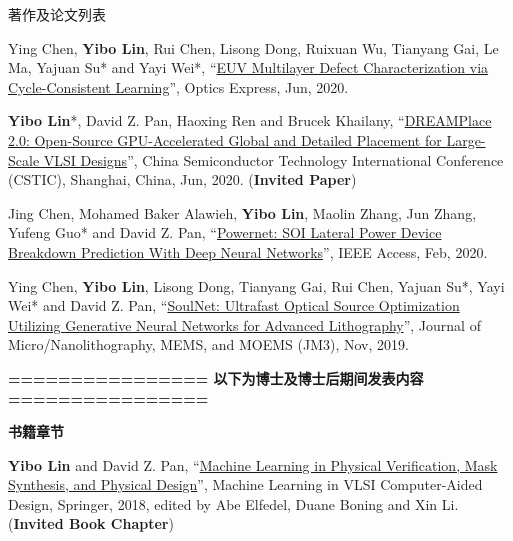 \begin{rSection}{著作及论文列表}
\begin{description}[font=\normalfont, rightmargin=2em]
{}
            

\item[{[J56]}]{
        Ying Chen, \textbf{Yibo Lin}, Rui Chen, Lisong Dong, Ruixuan Wu, Tianyang Gai, Le Ma, Yajuan Su* and Yayi Wei*, 
    ``\href{https://doi.org/10.1364/OE.394590}{EUV Multilayer Defect Characterization via Cycle-Consistent Learning}'', 
    Optics Express, Jun, 2020.
    
}
            

\item[{[C55]}]{
        \textbf{Yibo Lin}*, David Z. Pan, Haoxing Ren and Brucek Khailany, 
    ``\href{https://doi.org/10.1109/CSTIC49141.2020.9282573}{DREAMPlace 2.0: Open-Source GPU-Accelerated Global and Detailed Placement for Large-Scale VLSI Designs}'', 
    China Semiconductor Technology International Conference (CSTIC), Shanghai, China, Jun, 2020.
    (\textbf{Invited Paper})
}
            

\item[{[J54]}]{
        Jing Chen, Mohamed Baker Alawieh, \textbf{Yibo Lin}, Maolin Zhang, Jun Zhang, Yufeng Guo* and David Z. Pan, 
    ``\href{https://doi.org/10.1109/ACCESS.2020.2970966}{Powernet: SOI Lateral Power Device Breakdown Prediction With Deep Neural Networks}'', 
    IEEE Access, Feb, 2020.
    
}
            

\item[{[J53]}]{
        Ying Chen, \textbf{Yibo Lin}, Lisong Dong, Tianyang Gai, Rui Chen, Yajuan Su*, Yayi Wei* and David Z. Pan, 
    ``\href{https://dx.doi.org/10.1117/1.JMM.18.4.043506}{SoulNet: Ultrafast Optical Source Optimization Utilizing Generative Neural Networks for Advanced Lithography}'', 
    Journal of Micro/Nanolithography, MEMS, and MOEMS (JM3), Nov, 2019.
    
}
            

\end{description}
    

\begin{description}[font=\normalfont, rightmargin=2em]
    \item \textbf{================ 以下为博士及博士后期间发表内容 ================}
\end{description}
        

\textbf{书籍章节}
        

\begin{description}[font=\normalfont, rightmargin=2em]
    

\item[{[B1]}]{
        \textbf{Yibo Lin} and David Z. Pan, 
    ``\href{http://dx.doi.org/10.1007/978-3-030-04666-8_4}{Machine Learning in Physical Verification, Mask Synthesis, and Physical Design}'', 
    Machine Learning in VLSI Computer-Aided Design, Springer, 2018, edited by Abe Elfedel, Duane Boning and Xin Li.
    (\textbf{Invited Book Chapter})
}
            


\end{description}
\end{rSection}
